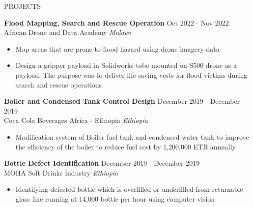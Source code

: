 \documentclass{resume} %
\begin{document}
\begin{rSection}{PROJECTS}

\textbf{Flood Mapping, Search and Rescue Operation} \hfill Oct 2022 - Nov 2022\\
African Drone and Data Academy \hfill \textit{Malawi}
 \begin{itemize}
    \itemsep -3pt {} 
     \item Map areas that are prone to flood hazard using drone imagery data
    \item Design a gripper payload in Solidworks tobe mounted on S500 drone as a payload. The purpose was to deliver life-saving vests for flood victims during search and rescue operations
 \end{itemize}
 
\textbf{Boiler and Condensed Tank Control Design} \hfill December 2019 - December 2019\\
Coca Cola Beverages Africa - Ethiopia \hfill \textit{Ethiopia}
 \begin{itemize}
    \itemsep -3pt {} 
     \item Modification system of Boiler fuel tank and condensed water tank to improve the efficiency of the boiler to reduce fuel cost by 1,200,000 ETB annually
 \end{itemize}

\textbf{Bottle Defect Identification} \hfill December 2019 - December 2019\\
MOHA Soft Drinks Industry \hfill \textit{Ethiopia}
 \begin{itemize}
    \itemsep -3pt {} 
     \item Identifying defected bottle which is overfilled or underfilled from returnable glass line running at 14,000 bottle per hour using computer vision
 \end{itemize}

\end{rSection} 

\end{document}
